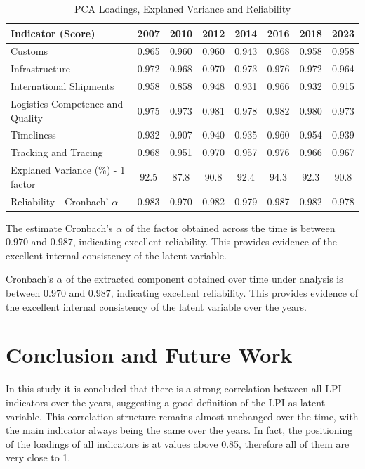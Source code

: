 \documentclass[conference]{IEEEtran}
\begin{document}
\begin{table}[h]
  \caption{PCA Loadings, Explaned Variance and Reliability}
  \label{tab:loadings}
  \centering
\begin{tabular}{lccccccc}
\hline
\textbf{Indicator (Score)}	&	\textbf{2007}	&	\textbf{2010}	&	\textbf{2012}	&	\textbf{2014}	&	\textbf{2016}	&	\textbf{2018}	&	\textbf{2023}	\\  
\hline
Customs	&	0.965	&	0.960	&	0.960	&	0.943	&	0.968	&	0.958	&	0.958	\\	
Infrastructure	&	0.972	&	0.968	&	0.970	&	0.973	&	0.976	&	0.972	&	0.964	\\	
International Shipments	&	0.958	&	0.858	&	0.948	&	0.931	&	0.966	&	0.932	&	0.915	\\	
Logistics Competence and Quality	&	0.975	&	0.973	&	0.981	&	0.978	&	0.982	&	0.980	&	0.973	\\	
Timeliness	&	0.932	&	0.907	&	0.940	&	0.935	&	0.960	&	0.954	&	0.939	\\	
Tracking and Tracing	&	0.968	&	0.951	&	0.970	&	0.957	&	0.976	&	0.966	&	0.967	\\	\hline
Explaned Variance (\%) - 1 factor 	&	92.5	&	87.8	&	90.8	&	92.4	&	94.3	&	92.3	&	90.8	\\	\hline
Reliability - Cronbach' $\alpha$	&	0.983	&	0.970	&	0.982	&	0.979	&	0.987	&	0.982	&	0.978	\\	\hline
\end{tabular}
\end{table}

The estimate Cronbach's $\alpha$ of the factor obtained across the time is between $0.970$ and $0.987$, indicating excellent reliability. This provides evidence of the excellent internal consistency of the latent variable.

Cronbach's $\alpha$ of the extracted component obtained over time under analysis is between $0.970$ and $0.987$, indicating excellent reliability. This provides evidence of the excellent internal consistency of the latent variable over the years.

\section{Conclusion and Future Work}

In this study it is concluded that there is a strong correlation between all LPI indicators over the years, suggesting a good definition of the LPI as latent variable. This correlation structure remains almost unchanged over the time, with the main indicator always being the same over the years. In fact, the positioning of the loadings of all indicators is at values above 0.85, therefore all of them are very close to 1.
\end{document}
